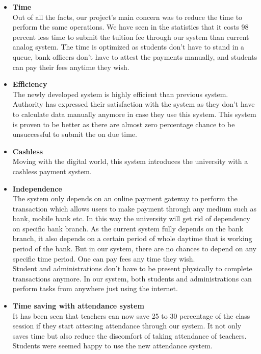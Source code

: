 \begin{itemize}

\item \textbf{Time}\\
Out of all the facts, our project's main concern was to reduce the time to perform the same operations. We have seen in the statistics that it costs 98 percent less time to submit the tuition fee through our system than current analog system. The time is optimized as students don't have to stand in a queue, bank officers don't have to attest the payments manually, and students can pay their fees anytime they wish.

\item \textbf{Efficiency}\\
The newly developed system is highly efficient than previous system. Authority has expressed their satisfaction with the system as they don't have to calculate data manually anymore in case they use this system. This system is proven to be better as there are almost zero percentage chance to be unsuccessful to submit the on due time.

\item \textbf{Cashless}\\
Moving with the digital world, this system introduces the university with a cashless payment system.

\item \textbf{Independence}\\
The system only depends on an online payment gateway to perform the transaction which allows users to make payment through any medium such as bank, mobile bank etc. In this way the university will get rid of dependency on specific bank branch. As the current system fully depends on the bank branch, it also depends on a certain period of whole daytime that is working period of the bank. But in our system, there are no chances to depend on any specific time period. One can pay fees any time they wish.\\
Student and administrations don't have to be present physically to complete transactions anymore. In our system, both students and administrations can perform tasks from anywhere just using the internet.

\item \textbf{Time saving with attendance system}\\
It has been seen that teachers can now save 25 to 30 percentage of the class session if they start attesting attendance through our system. It not only saves time but also reduce the discomfort of taking attendance of teachers. Students were seemed happy to use the new attendance system.


\end{itemize}

